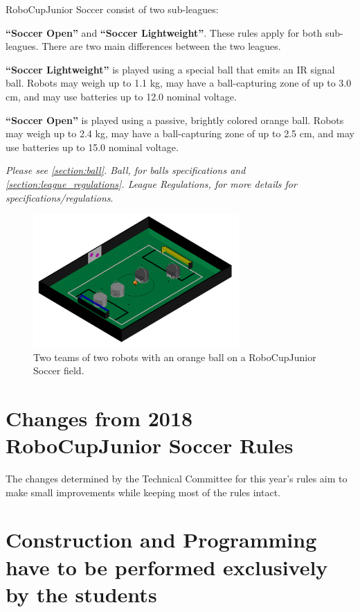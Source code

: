 \documentclass{article}
\begin{document}
RoboCupJunior Soccer consist of two sub-leagues:

\textbf{``Soccer Open''} and \textbf{``Soccer Lightweight''}. These rules apply
for both sub-leagues. There are two main differences between the two leagues.

\textbf{``Soccer Lightweight''} is played using a special ball that emits an IR
signal ball. Robots may weigh up to 1.1 kg, may have a ball-capturing zone of
up to 3.0 cm, and may use batteries up to 12.0 nominal voltage.

\textbf{``Soccer Open''} is played using a passive, brightly colored orange
ball. Robots may weigh up to 2.4 kg, may have a ball-capturing zone of up to
2.5 cm, and may use batteries up to 15.0 nominal voltage.

\textit{Please see \ref{section:ball}. Ball, for balls specifications and
    \ref{section:league_regulations}. League Regulations, for more details for specifications/regulations}.

\begin{figure}[H]
    \centering
    \includegraphics[width=0.7\textwidth]{media/image1_new.jpeg}
    \caption{Two teams of two robots with an orange ball on a RoboCupJunior
        Soccer field.}
    \label{fig:name}
\end{figure}

\section*{Changes from 2018 RoboCupJunior Soccer Rules}

The changes determined by the Technical Committee for this year's rules aim to
make small improvements while keeping most of the rules intact.

\listofchanges

\section*{Construction and Programming have to be performed exclusively by the students}
\end{document}
